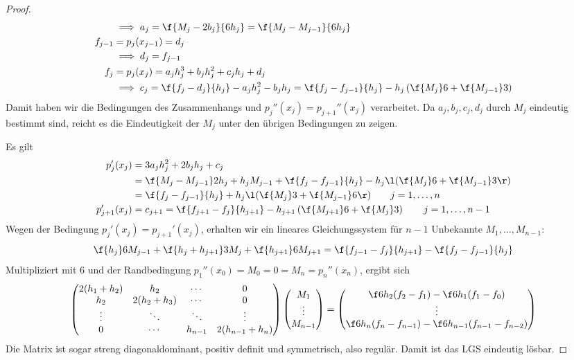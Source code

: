 \documentclass[11pt]{scrbook}
\begin{document}
\begin{st}
\begin{proof}
\begin{align*}
				&\implies a_j 
					= \f {M_j - 2b_j}{6h_j} 
					= \f {M_j - M_{j-1}}{6h_j} \\
			f_{j-1} &= p_j(x_{j-1}) 
				= d_j  \\
				&\implies d_j 
					= f_{j-1} \\
			f_j &= p_j(x_j) 
				= a_j h_j^3 + b_jh_j^2 + c_jh_j + d_j \\
				&\implies c_j 
					= \f{f_j-d_j}{h_j} - a_jh_j^2 - b_jh_j 
					= \f {f_j-f_{j-1}}{h_j} - h_j\left(\f {M_j}6 + \f{M_{j-1}}3 \right)
		\end{align*}
		Damit haben wir die Bedingungen des Zusammenhangs und $p_j''(x_j) = p_{j+1}''(x_j)$ verarbeitet.
		Da $a_j,b_j,c_j,d_j$ durch $M_j$ eindeutig bestimmt sind, reicht es die Eindeutigkeit der $M_j$ unter den übrigen Bedingungen zu zeigen.

		Es gilt
		\begin{align*}
			p_j'(x_j) &= 3a_jh_j^2 + 2b_jh_j + c_j \\
			&= \f {M_j-M_{j-1}}2 h_j + h_j M_{j-1} + \f {f_j - f_{j-1}}{h_j} - h_j \l( \f {M_j}6 + \f{M_{j-1}}3\r) \\
			&= \f {f_j-f_{j-1}}{h_j} + h_j \l( \f{M_j}3 + \f{M_{j-1}}6\r) \qquad j=1,\dotsc,n \\
			p_{j+1}'(x_j) &= c_{j+1} = \f {f_{j+1}-f_j}{h_{j+1}} - h_{j+1}\left( \f{M_{j+1}}6 + \f {M_j}3\right) \qquad j=1,\dotsc,n-1
		\end{align*}
		Wegen der Bedingung $p_j'(x_j) = p_{j+1}'(x_j)$, erhalten wir ein lineares Gleichungssystem für $n-1$ Unbekannte $M_1,\dotsc,M_{n-1}$:
		\[
			\f {h_j}6 M_{j-1} + \f {h_j + h_{j+1}}3 M_j + \f{h_{j+1}}6 M_{j+1} = \f {f_{j-1}-f_j}{h_{j+1}} - \f{f_j-f_{j-1}}{h_j}
		\]
		Multipliziert mit $6$ und der Randbedingung $p_1''(x_0) = M_0 = 0 = M_n = p_n''(x_n)$, ergibt sich
		\[
			\begin{pmatrix}
				2(h_1+h_2) & h_2 &  \cdots & 0 \\
				h_2 & 2(h_2+h_3) & \cdots  & 0 \\
				\vdots & \ddots & \ddots & \vdots\\
				0 & \cdots & h_{n-1} & 2(h_{n-1}+h_n)
			\end{pmatrix}
			\begin{pmatrix}
				M_1 \\ \vdots \\ M_{n-1}
			\end{pmatrix}
			=
			\begin{pmatrix}
				\f 6{h_2}(f_2-f_1) - \f 6{h_1}(f_1-f_0)\\
				\vdots \\
				\f 6{h_n}(f_n-f_{n-1})- \f 6{h_{n-1}}(f_{n-1}-f_{n-2})
			\end{pmatrix}
		\]
		Die Matrix ist sogar streng diagonaldominant, positiv definit und symmetrisch, also regulär.
		Damit ist das LGS eindeutig lösbar.


\end{proof}
\end{st}
\end{document}
